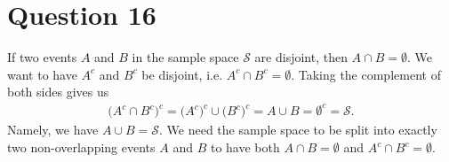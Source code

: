 \documentclass[10pt]{article}
\begin{document}
\section{Question 16} \noindent
If two events \(A\) and \(B\) in the sample space \(\mathcal{S}\) are disjoint, then \(A \cap B = \emptyset\). 
We want to have \(A^c\) and \(B^c\) be disjoint, i.e. \(A^c \cap B^c = \emptyset\).
Taking the complement of both sides gives us 
\begin{align*}
    \Big( A^c \cap B^c \Big)^c = \big( A^c \big)^c \cup \big( B^c \big)^c = A \cup B
    = \emptyset^c = \mathcal{S}.
\end{align*}
Namely, we have \(A \cup B = \mathcal{S}\). We need the sample space to be split into exactly two non-overlapping events \(A\) and \(B\) to have both 
\(A \cap B = \emptyset\) and \(A^c \cap B^c = \emptyset\).
\end{document}
